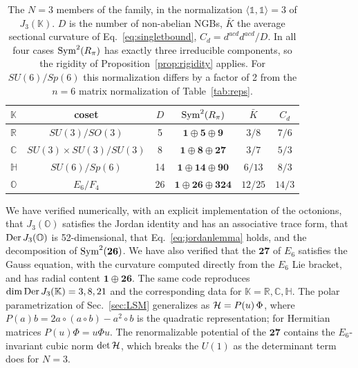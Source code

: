 \begin{table}[t]
\caption{The $N=3$ members of the family, in the normalization $\langle\mathbb{1},\mathbb{1}\rangle=3$ of $J_3(\mathbb K)$. $D$ is the number of non-abelian NGBs, $\bar K$ the average sectional curvature of Eq.~\eqref{eq:singletbound}, $C_d=d^{acd}d^{acd}/D$. In all four cases ${\rm Sym}^2(R_\pi)$ has exactly three irreducible components, so the rigidity of Proposition~\ref{prop:rigidity} applies. For $SU(6)/Sp(6)$ this normalization differs by a factor of 2 from the $n=6$ matrix normalization of Table~\ref{tab:reps}.}
\label{tab:magic}
\begin{ruledtabular}
\begin{tabular}{lccccc}
$\mathbb K$ & coset & $D$ & ${\rm Sym}^2(R_\pi)$ & $\bar K$ & $C_d$\\
\hline
$\mathbb R$ & $SU(3)/SO(3)$ & 5 & $\mathbf1\oplus\mathbf5\oplus\mathbf9$ & $3/8$ & $7/6$\\
$\mathbb C$ & $SU(3)\times SU(3)/SU(3)$ & 8 & $\mathbf1\oplus\mathbf8\oplus\mathbf{27}$ & $3/7$ & $5/3$\\
$\mathbb{H}$ & $SU(6)/Sp(6)$ & 14 & $\mathbf1\oplus\mathbf{14}\oplus\mathbf{90}$ & $6/13$ & $8/3$\\
$\mathbb O$ & $E_6/F_4$ & 26 & $\mathbf1\oplus\mathbf{26}\oplus\mathbf{324}$ & $12/25$ & $14/3$
\end{tabular}
\end{ruledtabular}
\end{table}

We have verified numerically, with an explicit implementation of the octonions, that $J_3(\mathbb O)$ satisfies the Jordan identity and has an associative trace form, that ${\rm Der}\,J_3(\mathbb O)$ is 52-dimensional, that Eq.~\eqref{eq:jordanlemma} holds, and the decomposition of ${\rm Sym}^2(\mathbf{26})$. We have also verified that the $\mathbf{27}$ of $E_6$ satisfies the Gauss equation, with the curvature computed directly from the $E_6$ Lie bracket, and has radial content $\mathbf1\oplus\mathbf{26}$. The same code reproduces $\dim{\rm Der}\,J_3(\mathbb K)=3,8,21$ and the corresponding data for $\mathbb K=\mathbb R,\mathbb C,\mathbb{H}$. The polar parametrization of Sec.~\ref{sec:LSM} generalizes as $\mathcal{H}=P(u)\,\Phi$, where $P(a)b=2a\circ(a\circ b)-a^2\circ b$ is the quadratic representation; for Hermitian matrices $P(u)\Phi=u\Phi u$. The renormalizable potential of the $\mathbf{27}$ contains the $E_6$-invariant cubic norm $\det\mathcal{H}$, which breaks the $U(1)$ as the determinant term does for $N=3$.
